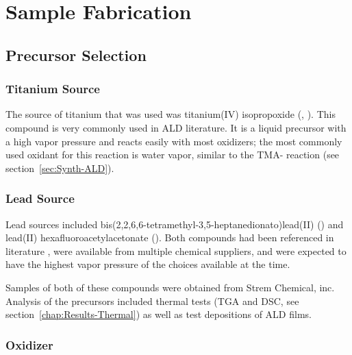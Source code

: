 \chapter{Sample Fabrication}
\label{ch:SampFab}
\thispagestyle{empty}



\section{Precursor Selection}
\label{sec:SampFab-Precursors}

\lipsum

\subsection{Titanium Source}

The source of titanium that was used was titanium(IV) isopropoxide (\TiOiPr{}, ). This compound is very commonly used in ALD literature. It is a liquid precursor with a high vapor pressure and reacts easily with most oxidizers; the most commonly used oxidant for this reaction is water vapor, similar to the TMA- reaction (see section~\vref{sec:Synth-ALD}). 

\subsection{Lead Source}

Lead sources included bis(2,2,6,6-tetramethyl-3,5-heptanedionato)lead(II) () and lead(II) hexafluoroacetylacetonate (). Both compounds had been referenced in literature , were available from multiple chemical suppliers, and were expected to have the highest vapor pressure of the choices available at the time. 

Samples of both of these compounds were obtained from Strem Chemical, inc.  Analysis of the precursors included thermal tests (TGA and DSC, see section~\vref{chap:Results-Thermal}) as well as test depositions of ALD films. 

\subsection{Oxidizer}

